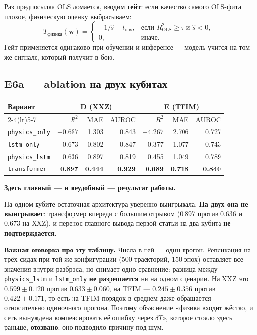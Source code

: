\documentclass[12pt,a4paper]{article}
\newcommand{\code}[1]{\texttt{#1}}
\begin{document}
Раз предпосылка OLS ломается, вводим \textbf{гейт}: если качество самого
OLS-фита плохое, физическую оценку выбрасываем:
\begin{equation}
  T_{\text{физика}}(\mathbf{w})=
  \begin{cases}
    -1/\hat{s}-t_{\mathrm{obs}}, & \text{если } R^2_{\mathrm{OLS}}\geq\tau
      \text{ и } \hat{s}<0,\\[2pt]
    0, & \text{иначе.}
  \end{cases}
\end{equation}
Гейт применяется одинаково при обучении и инференсе — модель учится на том же
сигнале, который получит в бою.

\subsection{E6a — ablation на двух кубитах}

\begin{center}\small
\begin{tabular}{@{}lrrrrrr@{}}
\toprule
Вариант & \multicolumn{3}{c}{D (XXZ)} & \multicolumn{3}{c}{E (TFIM)} \\
\cmidrule(lr){2-4}\cmidrule(lr){5-7}
 & $R^2$ & MAE & AUROC & $R^2$ & MAE & AUROC \\
\midrule
\code{physics\_only} & $-0.687$ & 1.303 & 0.843 & $-4.267$ & 2.706 & 0.727 \\
\code{lstm\_only} & 0.673 & 0.802 & 0.847 & 0.377 & 1.077 & 0.743 \\
\code{physics\_lstm} & 0.636 & 0.897 & 0.819 & 0.455 & 1.049 & 0.789 \\
\code{transformer} & \textbf{0.897} & \textbf{0.444} & \textbf{0.929}
  & \textbf{0.689} & \textbf{0.718} & \textbf{0.840} \\
\bottomrule
\end{tabular}
\end{center}

\textbf{Здесь главный — и неудобный — результат работы.}

На одном кубите остаточная архитектура уверенно выигрывала. \textbf{На двух она
не выигрывает}: трансформер впереди с большим отрывом (0.897 против 0.636 и
0.673 на XXZ), и перенос главного вывода первой статьи на два кубита
\textbf{не подтверждается}.

\textbf{Важная оговорка про эту таблицу.} Числа в ней — один прогон. Репликация
на трёх сидах при той же конфигурации (500 траекторий, 150 эпох) оставляет все
значения внутри разброса, но снимает одно сравнение: разница между
\code{physics\_lstm} и \code{lstm\_only} \textbf{не разрешается} ни на одном
сценарии. На XXZ это $0.599 \pm 0.120$ против $0.633 \pm 0.060$, на TFIM —
$0.245 \pm 0.356$ против $0.422 \pm 0.171$, то есть на TFIM порядок в среднем
даже обращается относительно одиночного прогона. Поэтому объяснение «физика
входит жёстко, и сеть вынуждена компенсировать её ошибку через $\delta T$»,
которое стояло здесь раньше, \textbf{отозвано}: оно подводило причину под шум.
\end{document}

